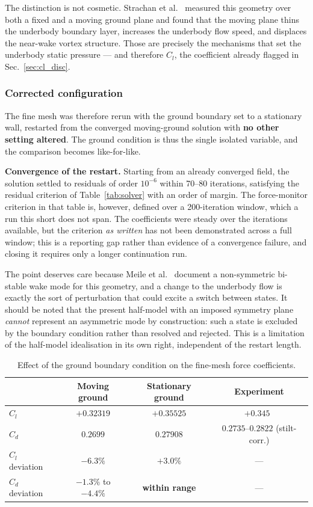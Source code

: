 \documentclass[12pt,a4paper]{article}
\begin{document}
\noindent
The distinction is not cosmetic. Strachan et al.~\cite{strachan2007} measured this geometry over
both a fixed and a moving ground plane and found that the moving plane thins the underbody boundary
layer, increases the underbody flow speed, and displaces the near-wake vortex structure. Those are
precisely the mechanisms that set the underbody static pressure — and therefore $C_l$, the
coefficient already flagged in Sec.~\ref{sec:cl_disc}.

\subsubsection*{Corrected configuration}

The fine mesh was therefore rerun with the ground boundary set to a stationary wall, restarted from
the converged moving-ground solution with \textbf{no other setting altered}. The ground condition is
thus the single isolated variable, and the comparison becomes like-for-like.

\textbf{Convergence of the restart.} Starting from an already converged field, the solution settled
to residuals of order $10^{-6}$ within 70--80 iterations, satisfying the residual criterion of
Table~\ref{tab:solver} with an order of margin. The force-monitor criterion in that table is,
however, defined over a 200-iteration window, which a run this short does not span. The coefficients
were steady over the iterations available, but the criterion \emph{as written} has not been
demonstrated across a full window; this is a reporting gap rather than evidence of a convergence
failure, and closing it requires only a longer continuation run.

The point deserves care because Meile et al.~\cite{meile2016} document a non-symmetric bi-stable
wake mode for this geometry, and a change to the underbody flow is exactly the sort of perturbation
that could excite a switch between states. It should be noted that the present half-model with an
imposed symmetry plane \emph{cannot} represent an asymmetric mode by construction: such a state is
excluded by the boundary condition rather than resolved and rejected. This is a limitation of the
half-model idealisation in its own right, independent of the restart length.

\begin{table}[H]
\centering
\caption{Effect of the ground boundary condition on the fine-mesh force coefficients.}
\label{tab:ground_effect}
\begin{tabular}{lccc}
\toprule
 & Moving ground & Stationary ground & Experiment \\
\midrule
$C_l$ & $+0.32319$ & $\mathbf{+0.35525}$ & $+0.345$~\cite{meile2011} \\
$C_d$ & $0.2699$   & $\mathbf{0.27908}$  & $0.2735$–$0.2822$ (stilt-corr.) \\
\midrule
$C_l$ deviation & $-6.3\%$ & $\mathbf{+3.0\%}$ & — \\
$C_d$ deviation & $-1.3\%$ to $-4.4\%$ & \textbf{within range} & — \\
\bottomrule
\end{tabular}
\end{table}
\end{document}
